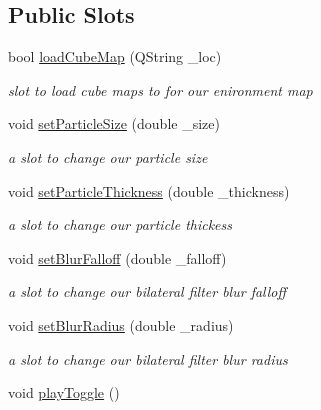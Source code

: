 \subsection*{Public Slots}
\begin{DoxyCompactItemize}
\item 
bool \hyperlink{class_open_g_l_widget_ae26021ef3dd9a8f6a9fd68d4ce44a6ee}{load\-Cube\-Map} (Q\-String \-\_\-loc)
\begin{DoxyCompactList}\small\item\em slot to load cube maps to for our enironment map \end{DoxyCompactList}\item 
void \hyperlink{class_open_g_l_widget_a83bd4b62dc32eac33e84d570e31ddc1c}{set\-Particle\-Size} (double \-\_\-size)
\begin{DoxyCompactList}\small\item\em a slot to change our particle size \end{DoxyCompactList}\item 
void \hyperlink{class_open_g_l_widget_aef63bb4f820d5909837330d8cd220c20}{set\-Particle\-Thickness} (double \-\_\-thickness)
\begin{DoxyCompactList}\small\item\em a slot to change our particle thickess \end{DoxyCompactList}\item 
void \hyperlink{class_open_g_l_widget_a18386d03c765a2b49d947573d5e98561}{set\-Blur\-Falloff} (double \-\_\-falloff)
\begin{DoxyCompactList}\small\item\em a slot to change our bilateral filter blur falloff \end{DoxyCompactList}\item 
void \hyperlink{class_open_g_l_widget_a9115db4eeda180baaa8d14fae56d4ad2}{set\-Blur\-Radius} (double \-\_\-radius)
\begin{DoxyCompactList}\small\item\em a slot to change our bilateral filter blur radius \end{DoxyCompactList}\item 
\hypertarget{class_open_g_l_widget_a1b2f1e0736d69c0970823f9d31d908f7}{void \hyperlink{class_open_g_l_widget_a1b2f1e0736d69c0970823f9d31d908f7}{play\-Toggle} ()}\label{class_open_g_l_widget_a1b2f1e0736d69c0970823f9d31d908f7}


\end{DoxyCompactItemize}
